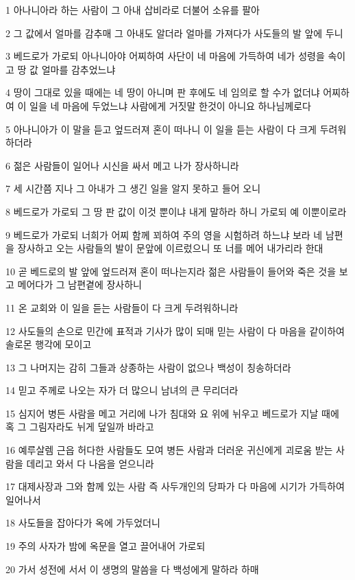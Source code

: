 \par 1 아나니아라 하는 사람이 그 아내 삽비라로 더불어 소유를 팔아
\par 2 그 값에서 얼마를 감추매 그 아내도 알더라 얼마를 가져다가 사도들의 발 앞에 두니
\par 3 베드로가 가로되 아나니아야 어찌하여 사단이 네 마음에 가득하여 네가 성령을 속이고 땅 값 얼마를 감추었느냐
\par 4 땅이 그대로 있을 때에는 네 땅이 아니며 판 후에도 네 임의로 할 수가 없더냐 어찌하여 이 일을 네 마음에 두었느냐 사람에게 거짓말 한것이 아니요 하나님께로다
\par 5 아나니아가 이 말을 듣고 엎드러져 혼이 떠나니 이 일을 듣는 사람이 다 크게 두려워하더라
\par 6 젊은 사람들이 일어나 시신을 싸서 메고 나가 장사하니라
\par 7 세 시간쯤 지나 그 아내가 그 생긴 일을 알지 못하고 들어 오니
\par 8 베드로가 가로되 그 땅 판 값이 이것 뿐이냐 내게 말하라 하니 가로되 예 이뿐이로라
\par 9 베드로가 가로되 너희가 어찌 함께 꾀하여 주의 영을 시험하려 하느냐 보라 네 남편을 장사하고 오는 사람들의 발이 문앞에 이르렀으니 또 너를 메어 내가리라 한대
\par 10 곧 베드로의 발 앞에 엎드러져 혼이 떠나는지라 젊은 사람들이 들어와 죽은 것을 보고 메어다가 그 남편곁에 장사하니
\par 11 온 교회와 이 일을 듣는 사람들이 다 크게 두려워하니라
\par 12 사도들의 손으로 민간에 표적과 기사가 많이 되매 믿는 사람이 다 마음을 같이하여 솔로몬 행각에 모이고
\par 13 그 나머지는 감히 그들과 상종하는 사람이 없으나 백성이 칭송하더라
\par 14 믿고 주께로 나오는 자가 더 많으니 남녀의 큰 무리더라
\par 15 심지어 병든 사람을 메고 거리에 나가 침대와 요 위에 뉘우고 베드로가 지날 때에 혹 그 그림자라도 뉘게 덮일까 바라고
\par 16 예루살렘 근읍 허다한 사람들도 모여 병든 사람과 더러운 귀신에게 괴로움 받는 사람을 데리고 와서 다 나음을 얻으니라
\par 17 대제사장과 그와 함께 있는 사람 즉 사두개인의 당파가 다 마음에 시기가 가득하여 일어나서
\par 18 사도들을 잡아다가 옥에 가두었더니
\par 19 주의 사자가 밤에 옥문을 열고 끌어내어 가로되
\par 20 가서 성전에 서서 이 생명의 말씀을 다 백성에게 말하라 하매

